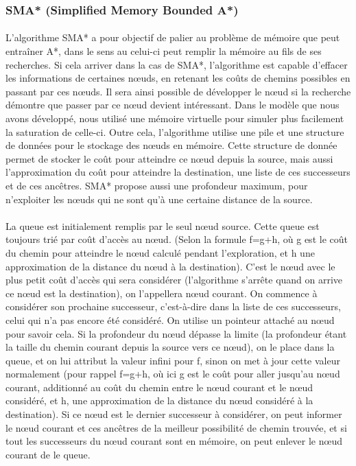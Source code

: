 \documentclass[pidr]{tnreport}
\begin{document}
			\subsubsection{SMA* (Simplified Memory Bounded A*)}	
\paragraph{}	
L'algorithme SMA* a pour objectif de palier au problème de mémoire que peut entraîner A*, dans le sens au celui-ci peut remplir la mémoire au fils de ses recherches. Si cela arriver dans la cas de SMA*, l'algorithme est capable d'effacer les informations de certaines nœuds, en retenant les coûts de chemins possibles en passant par ces nœuds. Il sera ainsi possible de développer le nœud si la recherche démontre que passer par ce nœud devient intéressant. Dans le modèle que nous avons développé, nous utilisé une mémoire virtuelle pour simuler plus facilement la saturation de celle-ci. Outre cela, l'algorithme utilise une pile et une structure de données pour le stockage des nœuds en mémoire. Cette structure de donnée permet de stocker le coût pour atteindre ce nœud depuis la source, mais aussi l'approximation du coût pour atteindre la destination, une liste de ces successeurs et de ces ancêtres. SMA* propose aussi une profondeur maximum, pour n'exploiter les nœuds qui ne sont qu'à une certaine distance de la source.

\paragraph{}				
La queue est initialement remplis par le seul nœud source. Cette queue est toujours trié par coût d'accès au nœud. (Selon la formule f=g+h, où g est le coût du chemin pour atteindre le nœud calculé pendant l'exploration, et h une approximation de la distance du nœud à la destination). C'est le nœud avec le plus petit coût d'accès qui sera considérer (l'algorithme s'arrête quand on arrive ce nœud est la destination), on l'appellera nœud courant. On commence à considérer son prochaine successeur, c'est-à-dire dans la liste de ces successeurs, celui qui n'a pas encore été considéré. On utilise un pointeur attaché au nœud pour savoir cela. Si la profondeur du nœud dépasse la limite (la profondeur étant la taille du chemin courant depuis la source vers ce nœud), on le place dans la queue, et on lui attribut la valeur infini pour f, sinon on met à jour cette valeur normalement (pour rappel f=g+h, où ici g est le coût pour aller jusqu'au nœud courant, additionné au coût du chemin entre le nœud courant et le nœud considéré, et h, une approximation de la distance du nœud considéré à la destination). Si ce nœud est le dernier successeur à considérer, on peut informer le nœud courant et ces ancêtres de la meilleur possibilité de chemin trouvée, et si tout les successeurs du nœud courant sont en mémoire, on peut enlever le nœud courant de le queue. 
		
\end{document}
